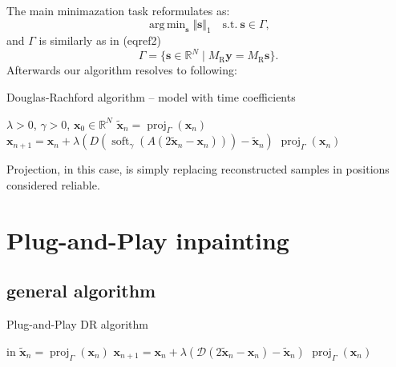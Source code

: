\documentclass[conference]{IEEEtran}
\begin{document}
The main minimazation task reformulates as:
\begin{equation*}
	\mathop {\operatorname{arg \, min}}_\mathbf {s}\Vert \mathbf {s}\Vert _1 \quad \text{s.t.}\ \mathbf {s}\in \Gamma, \tag{3}
\end{equation*} 
and $ \Gamma $ is similarly as in  (eqref2) %
\begin{equation*}
	\Gamma = \lbrace \mathbf {s}\in \mathbb {R}^N\mid M_{\mathrm{R}}\mathbf {y}=M_{\mathrm{R}}\mathbf {s}\rbrace. \tag{4} 
\end{equation*}
Afterwards our algorithm resolves to following: 
\begin{algorithm}
	\caption{Douglas-Rachford algorithm -- model with time coefficients}
	\begin{algorithmic}[1]
		\renewcommand{\algorithmicrequire}{\textbf{Input:}}
		\renewcommand{\algorithmicensure}{\textbf{Output:}}
		\REQUIRE $ \lambda > 0 $, $ \gamma>0 $, $ \mathbf{x}_0 \in \mathbb{R}^{N} $
		\STATE $\mathbf{\widetilde{x}}_n=\operatorname{proj}_{\Gamma}(\mathbf{x}_n) $ 
		\STATE $ \mathbf{x}_{n+1} = \mathbf{x}_n + \lambda \left( D\left(\operatorname{soft}_{\gamma}\left(A\left(2\mathbf{\widetilde{x}}_n-\mathbf{x}_n\right) \right)\right) -\mathbf{\widetilde{x}}_n\right)$
		\ENDFOR
		\RETURN $\operatorname{proj}_{\Gamma}(\mathbf{x}_n)$ 
	\end{algorithmic} 
\end{algorithm}

Projection, in this case, is simply replacing reconstructed samples in positions considered reliable.

\section{Plug-and-Play inpainting} \label{sec:plugaandplay}

\subsection{general algorithm}

\begin{algorithm}
	\caption{Plug-and-Play DR algorithm}
	\begin{algorithmic}[1]
		\renewcommand{\algorithmicrequire}{\textbf{Input:}}
		\renewcommand{\algorithmicensure}{\textbf{Output:}}
		\REQUIRE in
		\STATE $\mathbf{\widetilde{x}}_n=\operatorname{proj}_{\Gamma}(\mathbf{x}_n) $ 
		\STATE $ \mathbf{x}_{n+1} = \mathbf{x}_n + \lambda \left( \mathcal{D} \left(2\mathbf{\widetilde{x}}_n-\mathbf{x}_n \right)-\mathbf{\widetilde{x}}_n\right)$
		\ENDFOR
		\RETURN $\operatorname{proj}_{\Gamma}(\mathbf{x}_n)$ 
	\end{algorithmic} 
\end{algorithm}
\end{document}
